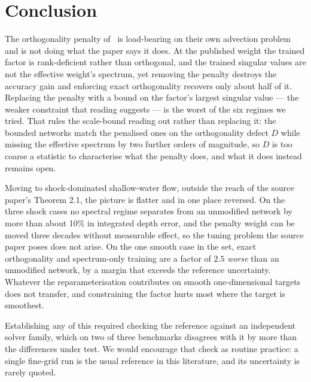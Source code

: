 \documentclass[11pt]{article}
\newcommand{\DU}{D}
\begin{document}
\section{Conclusion}

The orthogonality penalty of~\cite{wang2026cnpinn} is load-bearing on their
own advection problem and is not doing what the paper says it does. At the
published weight the trained factor is rank-deficient rather than orthogonal,
and the trained singular values are not the effective weight's spectrum, yet
removing the penalty destroys the accuracy gain and enforcing exact
orthogonality recovers only about half of it. Replacing the penalty with a
bound on the factor's largest singular value --- the weaker constraint that
reading suggests --- is the worst of the six regimes we tried. That rules the
scale-bound reading out rather than replacing it: the bounded networks match
the penalised ones on the orthogonality defect $\DU$ while missing the
effective spectrum by two further orders of magnitude, so $\DU$ is too coarse
a statistic to characterise what the penalty does, and what it does instead
remains open.

Moving to shock-dominated shallow-water flow, outside the reach of the source
paper's Theorem 2.1, the picture is flatter and in one place reversed. On the
three shock cases no spectral regime separates from an unmodified network by
more than about 10\% in integrated depth error, and the penalty weight can be
moved three decades without measurable effect, so the tuning problem the
source paper poses does not arise. On the one smooth case in the set, exact
orthogonality and spectrum-only training are a factor of $2.5$ \emph{worse}
than an unmodified network, by a margin that exceeds the reference
uncertainty. Whatever the reparameterisation contributes on smooth
one-dimensional targets does not transfer, and constraining the factor
hurts most where the target is smoothest.

Establishing any of this required checking the reference against an
independent solver family, which on two of three benchmarks disagrees with it
by more than the differences under test. We would encourage that check as
routine practice: a single fine-grid run is the usual reference in this
literature, and its uncertainty is rarely quoted.



\end{document}
